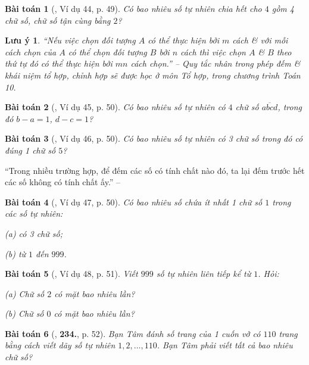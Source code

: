 \documentclass{article}
\numberwithin{equation}{section}
\newtheorem{baitoan}{Bài toán}
\newtheorem{luuy}{Lưu ý}[section]
\begin{document}
\begin{baitoan}[\cite{Binh_Toan_6_tap_1}, Ví dụ 44, p. 49]
	Có bao nhiêu số tự nhiên chia hết cho $4$ gồm 4 chữ số, chữ số tận cùng bằng $2$?
\end{baitoan}

\begin{luuy}
	``Nếu việc chọn đối tượng $A$ có thể thực hiện bởi $m$ cách \& với mỗi cách chọn của $A$ có thể chọn đối tượng $B$ bởi $n$ cách thì việc chọn $A$ \& $B$ theo thứ tự đó có thể thực hiện bởi $mn$ cách chọn.'' -- \cite[p. 50]{Binh_Toan_6_tap_1} \emph{Quy tắc nhân trong phép đếm} \& khái niệm \emph{tổ hợp, chỉnh hợp} sẽ được học ở môn Tổ hợp, trong chương trình Toán 10.
\end{luuy}

\begin{baitoan}[\cite{Binh_Toan_6_tap_1}, Ví dụ 45, p. 50]
	Có bao nhiêu số tự nhiên có $4$ chữ số $\overline{abcd}$, trong đó $b - a = 1$, $d - c = 1$?
\end{baitoan}

\begin{baitoan}[\cite{Binh_Toan_6_tap_1}, Ví dụ 46, p. 50]
	Có bao nhiêu số tự nhiên có 3 chữ số trong đó có đúng 1 chữ số $5$?
\end{baitoan}
``Trong nhiều trường hợp, để đếm các số có tính chất nào đó, ta lại đếm trước hết các số không có tính chất ấy.'' -- \cite[p. 51]{Binh_Toan_6_tap_1}

\begin{baitoan}[\cite{Binh_Toan_6_tap_1}, Ví dụ 47, p. 50]
	Có bao nhiêu số chứa ít nhất 1 chữ số $1$ trong các số tự nhiên:
	\begin{enumerate*}
		\item[(a)] có 3 chữ số;
		\item[(b)] từ $1$ đến $999$.
	\end{enumerate*}
\end{baitoan}

\begin{baitoan}[\cite{Binh_Toan_6_tap_1}, Ví dụ 48, p. 51]
	Viết $999$ số tự nhiên liên tiếp kể từ $1$. Hỏi:
	\begin{enumerate*}
		\item[(a)] Chữ số $2$ có mặt bao nhiêu lần?
		\item[(b)] Chữ số $0$ có mặt bao nhiêu lần?
	\end{enumerate*}
\end{baitoan}

\begin{baitoan}[\cite{Binh_Toan_6_tap_1}, \textbf{234.}, p. 52]
	Bạn Tâm đánh số trang của 1 cuốn vở có $110$ trang bằng cách viết dãy số tự nhiên $1,2,\ldots,110$. Bạn Tâm phải viết tất cả bao nhiêu chữ số?
\end{baitoan}
\end{document}
